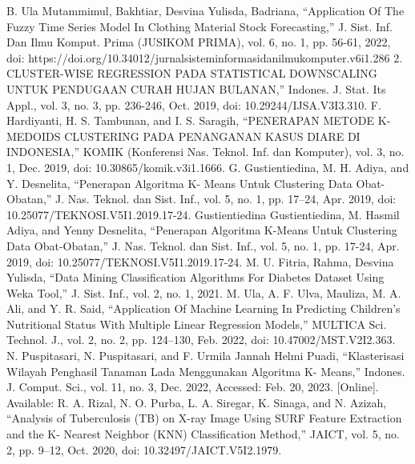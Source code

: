 \documentclass[conference]{IEEEtran}
\begin{document}
\begin{thebibliography}{00}
 B. Ula Mutammimul, Bakhtiar, Desvina Yulisda, Badriana, “Application Of The Fuzzy Time Series Model In Clothing Material Stock Forecasting,” J. Sist. Inf. Dan Ilmu Komput. Prima (JUSIKOM PRIMA), vol. 6, no. 1, pp. 56-61, 2022, doi: https://doi.org/10.34012/jurnalsisteminformasidanilmukomputer.v6i1.286 2.
 CLUSTER-WISE REGRESSION PADA STATISTICAL DOWNSCALING UNTUK PENDUGAAN CURAH HUJAN BULANAN,” Indones. J. Stat. Its Appl., vol. 3, no. 3, pp. 236-246, Oct. 2019, doi: 10.29244/IJSA.V3I3.310.
 F. Hardiyanti, H. S. Tambunan, and I. S. Saragih, “PENERAPAN METODE K- MEDOIDS CLUSTERING PADA PENANGANAN KASUS DIARE DI INDONESIA,” KOMIK (Konferensi Nas. Teknol. Inf. dan Komputer), vol. 3, no. 1, Dec. 2019, doi: 10.30865/komik.v3i1.1666.
 G. Gustientiedina, M. H. Adiya, and Y. Desnelita, “Penerapan Algoritma K- Means Untuk Clustering Data Obat-Obatan,” J. Nas. Teknol. dan Sist. Inf., vol. 5, no. 1, pp. 17–24, Apr. 2019, doi: 10.25077/TEKNOSI.V5I1.2019.17-24.
 Gustientiedina Gustientiedina, M. Hasmil Adiya, and Yenny Desnelita, “Penerapan Algoritma K-Means Untuk Clustering Data Obat-Obatan,” J. Nas. Teknol. dan Sist. Inf., vol. 5, no. 1, pp. 17-24, Apr. 2019, doi: 10.25077/TEKNOSI.V5I1.2019.17-24.
 M. U. Fitria, Rahma, Desvina Yulisda, “Data Mining Classification Algorithms For Diabetes Dataset Using Weka Tool,” J. Sist. Inf., vol. 2, no. 1, 2021.
 M. Ula, A. F. Ulva, Mauliza, M. A. Ali, and Y. R. Said, “Application Of Machine Learning In Predicting Children's Nutritional Status With Multiple Linear Regression Models,” MULTICA Sci. Technol. J., vol. 2, no. 2, pp. 124–130, Feb. 2022, doi: 10.47002/MST.V2I2.363.
 N. Puspitasari, N. Puspitasari, and F. Urmila Jannah Helmi Puadi, “Klasterisasi Wilayah Penghasil Tanaman Lada Menggunakan Algoritma K- Means,” Indones. J. Comput. Sci., vol. 11, no. 3, Dec. 2022, Accessed: Feb. 20, 2023.	[Online].	Available:
 R. A. Rizal, N. O. Purba, L. A. Siregar, K. Sinaga, and N. Azizah, “Analysis of Tuberculosis (TB) on X-ray Image Using SURF Feature Extraction and the K- Nearest Neighbor (KNN) Classification Method,” JAICT, vol. 5, no. 2, pp. 9–12, Oct. 2020, doi: 10.32497/JAICT.V5I2.1979.

	
\end{thebibliography}
\end{document}
